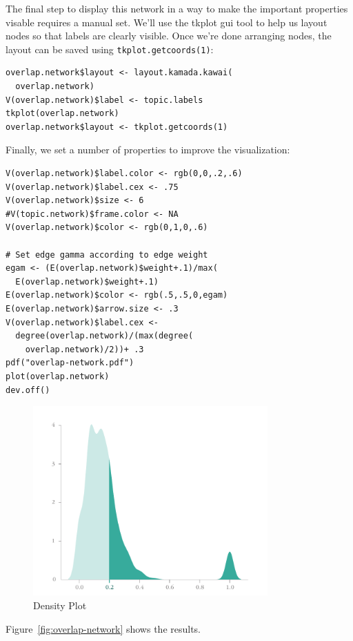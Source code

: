 \documentclass[%
	final,
	notitlepage,
	narroweqnarray,
	inline,
	]{ieee}
\begin{document}
The final step to display this network in a way to make the
important properties visable requires a manual set.  We'll use the
tkplot gui tool to help us layout nodes so that labels are clearly
visible. Once we're done arranging nodes, the layout can be saved
using {\tt tkplot.getcoords(1)}:


\begin{verbatim}
overlap.network$layout <- layout.kamada.kawai(
  overlap.network)
V(overlap.network)$label <- topic.labels
tkplot(overlap.network)
overlap.network$layout <- tkplot.getcoords(1)
\end{verbatim}

\noindent Finally, we set a number of properties to improve the
visualization:


\begin{verbatim}
V(overlap.network)$label.color <- rgb(0,0,.2,.6)
V(overlap.network)$label.cex <- .75
V(overlap.network)$size <- 6
#V(topic.network)$frame.color <- NA
V(overlap.network)$color <- rgb(0,1,0,.6)

# Set edge gamma according to edge weight
egam <- (E(overlap.network)$weight+.1)/max(
  E(overlap.network)$weight+.1)
E(overlap.network)$color <- rgb(.5,.5,0,egam)
E(overlap.network)$arrow.size <- .3
V(overlap.network)$label.cex <- 
  degree(overlap.network)/(max(degree(
    overlap.network)/2))+ .3
pdf("overlap-network.pdf")
plot(overlap.network)
dev.off()
\end{verbatim}

\begin{figure}
\centering
\includegraphics[width=90mm]{density.pdf}
\caption{Density Plot}
\label{fig:density}
\end{figure}

\noindent Figure~\ref{fig:overlap-network} shows the results.
\end{document}
